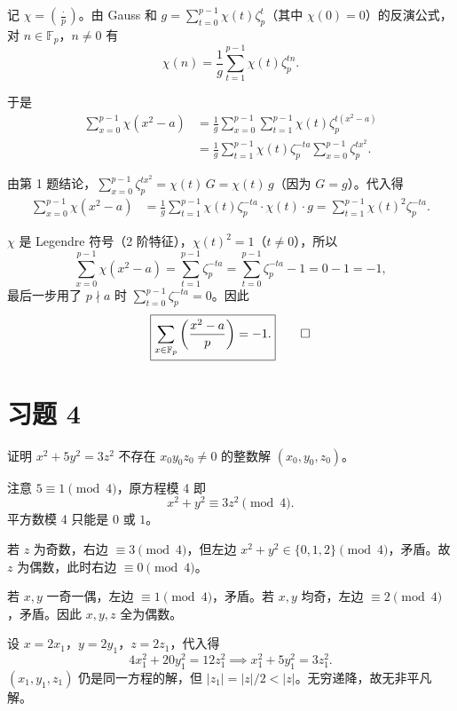 \documentclass{article}
\newcommand{\leg}[2]{\left(\frac{#1}{#2}\right)}
\begin{document}
\begin{solution}
  记 $\chi = \leg{\cdot}{p}$。由 Gauss 和 $g = \sum_{t=0}^{p-1} \chi(t) \zeta_p^t$（其中 $\chi(0) = 0$）的反演公式，对 $n \in \mathbb{F}_p$，$n \neq 0$ 有
  \[
    \chi(n) = \frac{1}{g} \sum_{t=1}^{p-1} \chi(t) \zeta_p^{tn}.
  \]

  于是
  \begin{align*}
    \sum_{x=0}^{p-1} \chi(x^2 - a)
    &= \frac{1}{g} \sum_{x=0}^{p-1} \sum_{t=1}^{p-1} \chi(t) \zeta_p^{t(x^2 - a)} \\
    &= \frac{1}{g} \sum_{t=1}^{p-1} \chi(t) \zeta_p^{-ta} \sum_{x=0}^{p-1} \zeta_p^{tx^2}.
  \end{align*}

  由第 1 题结论，$\sum_{x=0}^{p-1} \zeta_p^{tx^2} = \chi(t)\, G = \chi(t)\, g$（因为 $G = g$）。代入得
  \begin{align*}
    \sum_{x=0}^{p-1} \chi(x^2 - a)
    &= \frac{1}{g} \sum_{t=1}^{p-1} \chi(t) \zeta_p^{-ta} \cdot \chi(t) \cdot g
    = \sum_{t=1}^{p-1} \chi(t)^2 \zeta_p^{-ta}.
  \end{align*}

  $\chi$ 是 Legendre 符号（2 阶特征），$\chi(t)^2 = 1$（$t \neq 0$），所以
  \[
    \sum_{x=0}^{p-1} \chi(x^2 - a) = \sum_{t=1}^{p-1} \zeta_p^{-ta} = \sum_{t=0}^{p-1} \zeta_p^{-ta} - 1 = 0 - 1 = -1,
  \]
  最后一步用了 $p \nmid a$ 时 $\sum_{t=0}^{p-1} \zeta_p^{-ta} = 0$。因此
  \[
    \boxed{\sum_{x \in \mathbb{F}_p} \leg{x^2 - a}{p} = -1.} \qedhere
  \]
\end{solution}

\section{习题 4}

证明 $x^2 + 5y^2 = 3z^2$ 不存在 $x_0 y_0 z_0 \neq 0$ 的整数解 $(x_0, y_0, z_0)$。

\begin{solution}
  注意 $5 \equiv 1 \pmod{4}$，原方程模 4 即
  \[
    x^2 + y^2 \equiv 3z^2 \pmod{4}.
  \]
  平方数模 4 只能是 $0$ 或 $1$。

  若 $z$ 为奇数，右边 $\equiv 3 \pmod{4}$，但左边 $x^2 + y^2 \in \{0, 1, 2\} \pmod{4}$，矛盾。故 $z$ 为偶数，此时右边 $\equiv 0 \pmod{4}$。

  若 $x, y$ 一奇一偶，左边 $\equiv 1 \pmod{4}$，矛盾。若 $x, y$ 均奇，左边 $\equiv 2 \pmod{4}$，矛盾。因此 $x, y, z$ 全为偶数。

  设 $x = 2x_1$，$y = 2y_1$，$z = 2z_1$，代入得
  \[
    4x_1^2 + 20y_1^2 = 12z_1^2 \implies x_1^2 + 5y_1^2 = 3z_1^2.
  \]
  $(x_1, y_1, z_1)$ 仍是同一方程的解，但 $|z_1| = |z|/2 < |z|$。无穷递降，故无非平凡解。
\end{solution}
\end{document}

